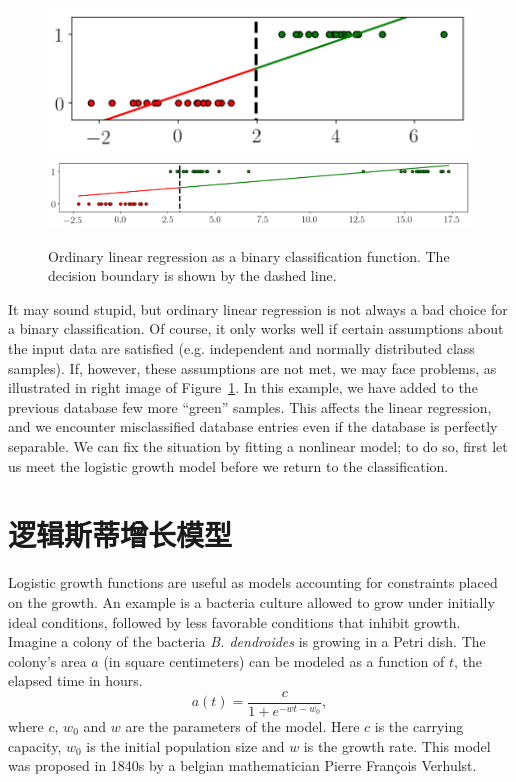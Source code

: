 \documentclass[notitlepage,oneside]{book}
\begin{document}
\begin{figure}[htb]
    \centering
    \includegraphics[width=.305\linewidth]{img/linear-1d-a.png}
    \includegraphics[width=.64\linewidth]{img/linear-1d-b.png}
    \caption{Ordinary linear regression as a binary classification function. The decision boundary is shown by the dashed line.}
    \label{fig:linear-regression-classification}
\end{figure}

It may sound stupid, but ordinary linear regression is not always a bad choice for a binary classification.
Of course, it only works well if certain assumptions about the input data are satisfied (e.g. independent and normally distributed class samples).
If, however, these assumptions are not met, we may face problems, as illustrated in right image of Figure~\ref{fig:linear-regression-classification}.
In this example, we have added to the previous database few more ``green'' samples. This affects the linear regression, and we encounter misclassified
database entries even if the database is perfectly separable. We can fix the situation by fitting a nonlinear model; to do so, first let us meet the logistic growth model
before we return to the classification.


\section{逻辑斯蒂增长模型}
\label{sec:logistic-growth}
Logistic growth functions are useful as models accounting for constraints placed on the growth.
An example is a bacteria culture allowed to grow under initially ideal conditions, followed by less favorable conditions that inhibit growth.
Imagine a colony of the bacteria \textit{B. dendroides} is growing in a Petri dish. The colony's area $a$ (in square centimeters) can be modeled as a function of $t$, the elapsed time in hours.
\begin{equation}
\label{eq:logistic-growth}
a(t) = \frac{c}{1+e^{-wt - w_0}},
\end{equation}
where $c$, $w_0$ and $w$ are the parameters of the model. Here $c$ is the carrying capacity, $w_0$ is the initial population size and $w$ is the growth rate.
This model was proposed in 1840s by a belgian mathematician Pierre François Verhulst.
\end{document}
